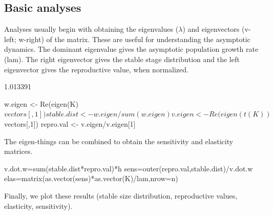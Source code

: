 \documentclass[11pt]{article}
\begin{document}
\subsection{Basic analyses}
\label{sec:Basic analyses}
Analyses usually begin with obtaining the eigenvalues ($\lambda$) and eigenvectors (v-left; w-right) of the matrix. These are useful for understanding the asymptotic dynamics. The dominant eigenvalue gives the asymptotic population growth rate (lam). The right eigenvector gives the stable stage distribution and the left eigenvector gives the reproductive value, when normalized.
\begin{Schunk}
\begin{Soutput}
[1] 1.013391
\end{Soutput}
\begin{Sinput}
 w.eigen <- Re(eigen(K)$vectors[,1])
 stable.dist <- w.eigen/sum(w.eigen) 
 v.eigen <- Re(eigen(t(K))$vectors[,1])
 repro.val <- v.eigen/v.eigen[1] 
\end{Sinput}
\end{Schunk}
The eigen-things can be combined to obtain the sensitivity and elasticity matrices.
\begin{Schunk}
\begin{Sinput}
 v.dot.w=sum(stable.dist*repro.val)*h
 sens=outer(repro.val,stable.dist)/v.dot.w
 elas=matrix(as.vector(sens)*as.vector(K)/lam,nrow=n)
\end{Sinput}
\end{Schunk}
Finally, we plot these results  (stable size distribution, reproductive values, elasticity, sensitivity). 
\end{document}
